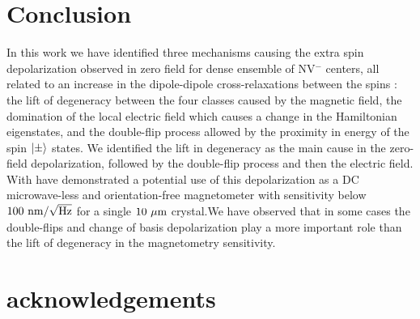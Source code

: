 \documentclass[preprintnumbers,amsmath,amssymb,superscriptaddress,twocolumn,showpacs]{revtex4-2}
\begin{document}
\section*{Conclusion}
In this work we have identified three mechanisms causing the extra spin depolarization observed in zero field for dense ensemble of NV$^-$ centers, all related to an increase in the dipole-dipole cross-relaxations between the spins : the lift of degeneracy between the four classes caused by the magnetic field, the domination of the local electric field which causes a change in the Hamiltonian eigenstates, and the double-flip process allowed by the proximity in energy of the spin $\ket{\pm}$ states. We identified the lift in degeneracy as the main cause in the zero-field depolarization, followed by the double-flip process and then the electric field. With have demonstrated a potential use of this depolarization as a DC microwave-less and orientation-free magnetometer with sensitivity below $100\ \rm{nm}/\sqrt{\rm Hz}$ for a single $10\ \mu \rm m$ crystal.We have observed that in some cases the double-flips and change of basis depolarization play a more important role than the lift of degeneracy in the magnetometry sensitivity.
\section*{acknowledgements}


{}
\end{document}
